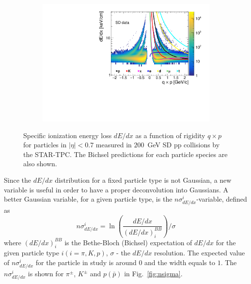\begin{figure}[H]
	\centering
	\parbox{0.99\textwidth}{
		\centering
		\begin{subfigure}[b]{\linewidth}{
				{\includegraphics[width=\linewidth, page=1]{graphics/pid/SDT_dEdx.pdf}}}
		\end{subfigure}
	}
	\caption[Specific ionization
		energy loss $dE/dx$ as a function of rigidity $q\times p$ for particles
		in $|\eta| < 0.7$ measured in $200$~GeV SD pp collisions
		by the STAR-TPC]{Specific ionization
	energy loss $dE/dx$ as a function of rigidity $q\times p$ for particles
	in $|\eta| < 0.7$ measured in $200$~GeV SD pp collisions
	by the STAR-TPC. The Bichsel predictions for each particle species are also shown.}
	\label{fig:dedx}
\end{figure} 
\noindent Since the $dE/dx$ distribution for a fixed particle type
is not Gaussian, a new variable is useful in order
to have a proper deconvolution into Gaussians. A better Gaussian variable, for a given
particle type, is the $n\sigma^i_{dE/dx}$-variable, defined as
\begin{equation}
n\sigma^i_{dE/dx}=\ln\left(\frac{dE/dx}{(dE/dx)_i^{BB}}\right)/\sigma
\end{equation}
where $(dE/dx)_i^{BB}$ is the Bethe-Bloch (Bichsel) expectation
of $dE/dx$ for the given particle type $i (i =
\pi, K, p)$, $\sigma$ - the $dE/dx$ resolution.
The expected value of $n\sigma^i_{dE/dx}$ for the particle in study is around $0$  and the width equals to $1$. The $n\sigma^i_{dE/dx}$ is shown for $\pi^{\pm}$, $K^\pm$ and $p(\bar{p})$ in Fig.~\ref{fig:nsigma}.


